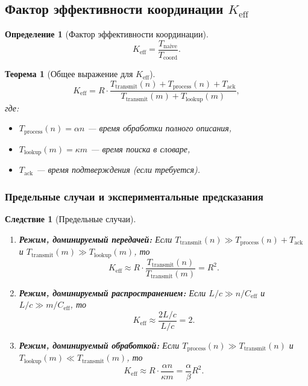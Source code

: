 \documentclass[11pt,a4paper]{article}
\newtheorem{theorem}{Теорема}
\newtheorem{definition}{Определение}
\newtheorem{corollary}{Следствие}
\begin{document}
	\subsection{Фактор эффективности координации $K_{\mathrm{eff}}$}
	
	\begin{definition}[Фактор эффективности координации]
		\[
		K_{\mathrm{eff}} = \frac{T_{\text{naive}}}{T_{\text{coord}}}.
		\]
	\end{definition}
	
	\begin{theorem}[Общее выражение для $K_{\mathrm{eff}}$]
		\label{thm:keff-expression}
		\[
		K_{\mathrm{eff}} = R \cdot \frac{T_{\text{transmit}}(n) + T_{\text{process}}(n) + T_{\text{ack}}}{T_{\text{transmit}}(m) + T_{\text{lookup}}(m)},
		\]
		где:
		\begin{itemize}
			\item $T_{\text{process}}(n) = \alpha n$ — время обработки полного описания,
			\item $T_{\text{lookup}}(m) = \kappa m$ — время поиска в словаре,
			\item $T_{\text{ack}}$ — время подтверждения (если требуется).
		\end{itemize}
	\end{theorem}
	
	\subsubsection{Предельные случаи и экспериментальные предсказания}
	
	\begin{corollary}[Предельные случаи]
		\begin{enumerate}
			\item \textbf{Режим, доминируемый передачей:} Если $T_{\text{transmit}}(n) \gg T_{\text{process}}(n) + T_{\text{ack}}$ и $T_{\text{transmit}}(m) \gg T_{\text{lookup}}(m)$, то
			\[
			K_{\mathrm{eff}} \approx R \cdot \frac{T_{\text{transmit}}(n)}{T_{\text{transmit}}(m)} = R^2.
			\]
			
			\item \textbf{Режим, доминируемый распространением:} Если $L/c \gg n/C_{\text{eff}}$ и $L/c \gg m/C_{\text{eff}}$, то
			\[
			K_{\mathrm{eff}} \approx \frac{2L/c}{L/c} = 2.
			\]
			
			\item \textbf{Режим, доминируемый обработкой:} Если $T_{\text{process}}(n) \gg T_{\text{transmit}}(n)$ и $T_{\text{lookup}}(m) \ll T_{\text{transmit}}(m)$, то
			\[
			K_{\mathrm{eff}} \approx R \cdot \frac{\alpha n}{\kappa m} = \frac{\alpha}{\beta} R^2.
			\]
		\end{enumerate}
	\end{corollary}
	
\end{document}

